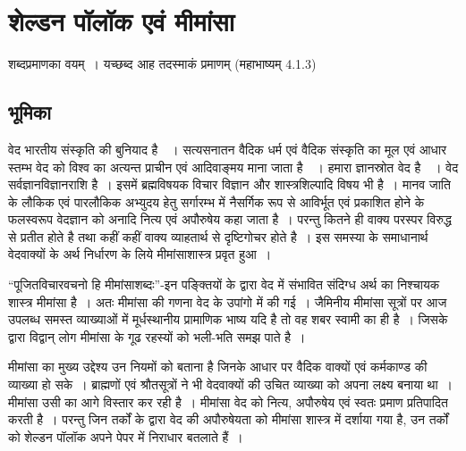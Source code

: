
\chapter{शेल्डन पॉलॉक एवं मीमांसा}\label{chapter1}


\begin{flushright}
\textit{}
\end{flushright}

\bgroup

\selectdev

\medskip

\centerline{शब्दप्रमाणका वयम्~। यच्छब्द आह तदस्माकं प्रमाणम् (महाभाष्यम् 4.1.3)}

\section*{भूमिका}

वेद भारतीय संस्कृति की बुनियाद है~~। सत्यसनातन वैदिक धर्म एवं वैदिक संस्कृति का मूल एवं आधार स्तम्भ वेद को विश्व का अत्यन्त प्राचीन एवं आदिवाङ्मय माना जाता है~~। हमारा ज्ञानस्रोत वेद है~~। वेद सर्वज्ञानविज्ञानराशि है~। इसमें ब्रह्मविषयक विचार विज्ञान और शास्त्रशिल्पादि विषय भी है~। मानव जाति के लौकिक एवं पारलौकिक अभ्युदय हेतु सर्गारम्भ में नैसर्गिक रूप से आविर्भूत एवं प्रकाशित होने के फलस्वरूप वेदज्ञान को अनादि नित्य एवं अपौरुषेय कहा जाता है~। परन्तु कितने ही वाक्य परस्पर विरुद्ध से प्रतीत होते है तथा कहीं कहीं वाक्य व्याहतार्थ से दृष्टिगोचर होते है~। इस समस्या के समाधानार्थ वेदवाक्यों के अर्थ निर्धारण के लिये मीमांसाशास्त्र प्रवृत हुआ~।

“पूजितविचारवचनो हि मीमांसाशब्दः”-इन पङ्क्तियों के द्वारा वेद में संभावित संदिग्ध अर्थ का निश्चायक शास्त्र मीमांसा है~। अतः मीमांसा की गणना वेद के उपांगो में की गई~। जैमिनीय मीमांसा सूत्रों पर आज उपलब्ध समस्त व्याख्याओं में मूर्धस्थानीय प्रामाणिक भाष्य यदि है तो वह शबर स्वामी का ही है~। जिसके द्वारा विद्वान् लोग मीमांसा के गूढ रहस्यों को भली-भति समझ पाते है~। 

मीमांसा का मुख्य उद्देश्य उन नियमों को बताना है जिनके आधार पर वैदिक वाक्यों एवं कर्मकाण्ड की व्याख्या हो सके~। ब्राह्मणों एवं श्रौतसूत्रों ने भी वेदवाक्यों की उचित व्याख्या को अपना लक्ष्य बनाया था~। मीमांसा उसी का आगे विस्तार कर रही है~। मीमांसा वेद को नित्य, अपौरुषेय एवं स्वतः प्रमाण प्रतिपादित करती है~। परन्तु जिन तर्कों के द्वारा वेद की अपौरुषेयता को मीमांसा शास्त्र में दर्शाया गया है, उन तर्कों को शेल्डन पॉलॉक अपने पेपर  में निराधार बतलाते हैं~।

